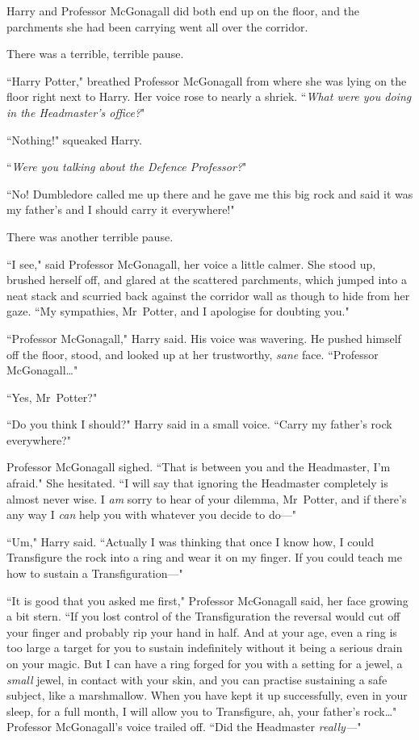 Harry and Professor McGonagall did both end up on the floor, and the parchments she had been carrying went all over the corridor.

There was a terrible, terrible pause.

``Harry Potter," breathed Professor McGonagall from where she was lying on the floor right next to Harry. Her voice rose to nearly a shriek. ``\emph{What were you doing in the Headmaster's office?}"

``Nothing!" squeaked Harry.

``\emph{Were you talking about the Defence Professor?}"

``No! Dumbledore called me up there and he gave me this big rock and said it was my father's and I should carry it everywhere!"

There was another terrible pause.

``I see," said Professor McGonagall, her voice a little calmer. She stood up, brushed herself off, and glared at the scattered parchments, which jumped into a neat stack and scurried back against the corridor wall as though to hide from her gaze. ``My sympathies, Mr~Potter, and I apologise for doubting you."

``Professor McGonagall," Harry said. His voice was wavering. He pushed himself off the floor, stood, and looked up at her trustworthy, \emph{sane} face. ``Professor McGonagall…"

``Yes, Mr~Potter?"

``Do you think I should?" Harry said in a small voice. ``Carry my father's rock everywhere?"

Professor McGonagall sighed. ``That is between you and the Headmaster, I'm afraid." She hesitated. ``I will say that ignoring the Headmaster completely is almost never wise. I \emph{am} sorry to hear of your dilemma, Mr~Potter, and if there's any way I \emph{can} help you with whatever you decide to do—"

``Um," Harry said. ``Actually I was thinking that once I know how, I could Transfigure the rock into a ring and wear it on my finger. If you could teach me how to sustain a Transfiguration—"

``It is good that you asked me first," Professor McGonagall said, her face growing a bit stern. ``If you lost control of the Transfiguration the reversal would cut off your finger and probably rip your hand in half. And at your age, even a ring is too large a target for you to sustain indefinitely without it being a serious drain on your magic. But I can have a ring forged for you with a setting for a jewel, a \emph{small} jewel, in contact with your skin, and you can practise sustaining a safe subject, like a marshmallow. When you have kept it up successfully, even in your sleep, for a full month, I will allow you to Transfigure, ah, your father's rock…" Professor McGonagall's voice trailed off. ``Did the Headmaster \emph{really—}"

